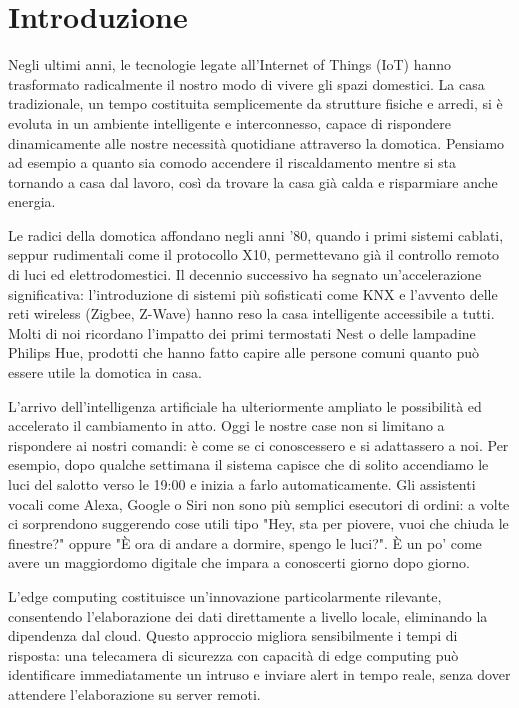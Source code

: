 \chapter{Introduzione}
Negli ultimi anni, le tecnologie legate all'Internet of Things (IoT) hanno trasformato radicalmente il nostro modo di vivere gli spazi domestici. La casa tradizionale, un tempo costituita semplicemente da strutture fisiche e arredi, si è evoluta in un ambiente intelligente e interconnesso, capace di rispondere dinamicamente alle nostre necessità quotidiane attraverso la domotica. Pensiamo ad esempio a quanto sia comodo accendere il riscaldamento mentre si sta tornando a casa dal lavoro, così da trovare la casa già calda e risparmiare anche energia.

\vspace{0.5cm}
Le radici della domotica affondano negli anni '80, quando i primi sistemi cablati, seppur rudimentali come il protocollo X10, permettevano già il controllo remoto di luci ed elettrodomestici. Il decennio successivo ha segnato un'accelerazione significativa: l'introduzione di sistemi più sofisticati come KNX e l'avvento delle reti wireless (Zigbee, Z-Wave) hanno reso la casa intelligente accessibile a tutti. Molti di noi ricordano l'impatto dei primi termostati Nest o delle lampadine Philips Hue, prodotti che hanno fatto capire alle persone comuni quanto può essere utile la domotica in casa.

\vspace{0.5cm}
L'arrivo dell'intelligenza artificiale ha ulteriormente ampliato le possibilità ed accelerato il cambiamento in atto. Oggi le nostre case non si limitano a rispondere ai nostri comandi: è come se ci conoscessero e si adattassero a noi. Per esempio, dopo qualche settimana il sistema capisce che di solito accendiamo le luci del salotto verso le 19:00 e inizia a farlo automaticamente. Gli assistenti vocali come Alexa, Google o Siri non sono più semplici esecutori di ordini: a volte ci sorprendono suggerendo cose utili tipo "Hey, sta per piovere, vuoi che chiuda le finestre?" oppure "È ora di andare a dormire, spengo le luci?". È un po' come avere un maggiordomo digitale che impara a conoscerti giorno dopo giorno.

\vspace{0.5cm}
L'edge computing costituisce un'innovazione particolarmente rilevante, consentendo l'elaborazione dei dati direttamente a livello locale, eliminando la dipendenza dal cloud. Questo approccio migliora sensibilmente i tempi di risposta: una telecamera di sicurezza con capacità di edge computing può identificare immediatamente un intruso e inviare alert in tempo reale, senza dover attendere l'elaborazione su server remoti.


